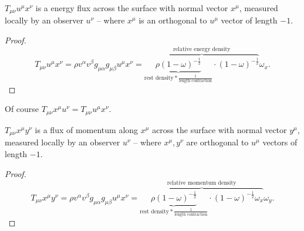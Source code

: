 \documentclass[main.tex]{subfiles}
\begin{document}
\begin{fact}
$T_{\mu\nu} u^\mu x^\nu$ is a energy flux across the surface with normal vector $x^\mu$, measured locally by an observer $u^\nu$ -- where $x^\mu$ is an orthogonal to $u^\mu$ vector of length $-1$.  
\end{fact}
\begin{proof}
\begin{equation}
T_{\mu\nu} u^\mu x^\nu = \rho v^\alpha v^\beta g_{\mu\alpha}g_{\mu\beta} u^\mu x^\nu = \overbrace{\underbrace{\rho (1 - \omega)^{-\frac{1}{2}}}_{\text{rest density} * \frac{1}{\text{length contraction}}} \cdot (1 - \omega)^{-\frac{1}{2}}}^\text{relative energy density} \omega_x.
\end{equation}
\end{proof}

Of course $T_{\mu\nu} x^\mu u^\nu = T_{\mu\nu} u^\mu x^\nu$.

\begin{fact}
$T_{\mu\nu} x^\mu y^\nu$ is a flux of momentum along $x^\mu$ across the surface with normal vector $y^\mu$, measured locally by an observer $u^\nu$ -- where $x^\mu, y^\nu$ are orthogonal to $u^\mu$ vectors of length $-1$.  
\end{fact}
\begin{proof}
\begin{equation}
T_{\mu\nu} x^\mu y^\nu = \rho v^\alpha v^\beta g_{\mu\alpha}g_{\mu\beta} u^\mu x^\nu = \overbrace{\underbrace{\rho (1 - \omega)^{-\frac{1}{2}}}_{\text{rest density} * \frac{1}{\text{length contraction}}} \cdot (1 - \omega)^{-\frac{1}{2}}\omega_x}^\text{relative momentum density} \omega_y.
\end{equation}
\end{proof}   
\end{document}
